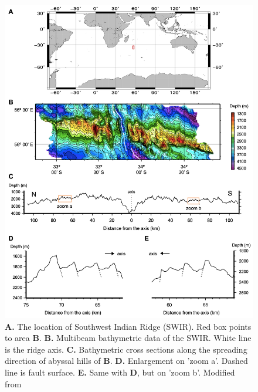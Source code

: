 \documentclass[letterpaper,12pt,notitle]{memphisthesis}                     %
\begin{document}
\begin{figure}[!htb]
	\centering
	\includegraphics[width=0.9\linewidth]{./figs/abyssalhill.png}
	\caption{\textbf{A.} The location of Southwest Indian Ridge (SWIR). Red box points to area \textbf{B}. \textbf{B.} Multibeam bathymetric data of the SWIR. White line is the ridge axis. \textbf{C.} Bathymetric cross sections along the spreading direction of abyssal hills of \textbf{B}. \textbf{D.} Enlargement on 'zoom a'. Dashed line is fault surface. \textbf{E.} Same with \textbf{D}, but on 'zoom b'. Modified from \citet{Mendel2003}}
	\label{fig:abyssalhill}
\end{figure}
\end{document}
